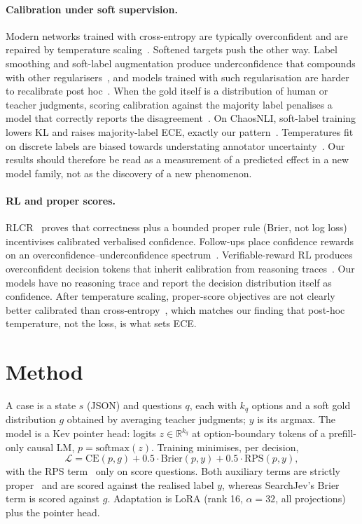 \documentclass{article}
\begin{document}
\paragraph{Calibration under soft supervision.} Modern networks trained with
cross-entropy are typically overconfident and are repaired by temperature
scaling~\cite{guo2017calibration,desai2020calibration}. Softened targets
push the other way. Label smoothing and soft-label augmentation produce
underconfidence that compounds with other
regularisers~\cite{muller2019labelsmoothing,wen2021ensembles}, and models
trained with such regularisation are harder to recalibrate
post hoc~\cite{wang2021rethinking}. When the gold itself is a distribution
of human or teacher judgments, scoring calibration against the majority
label penalises a model that correctly reports the
disagreement~\cite{baan2022stop,nie2020chaosnli}. On ChaosNLI, soft-label
training lowers KL and raises majority-label ECE, exactly our
pattern~\cite{kohli2026saturation}. Temperatures fit on discrete labels are
biased towards understating annotator
uncertainty~\cite{tao2026ambiguous,dogah2026tsnotenough}. Our results
should therefore be read as a measurement of a predicted effect in a new
model family, not as the discovery of a new phenomenon.

\paragraph{RL and proper scores.} RLCR~\cite{damani2025rlcr} proves that
correctness plus a bounded proper rule (Brier, not log loss) incentivises
calibrated verbalised confidence. Follow-ups place confidence rewards on an
overconfidence--underconfidence spectrum~\cite{tan2026rewardfunctions}.
Verifiable-reward RL produces overconfident decision tokens that inherit
calibration from reasoning traces~\cite{yaldiz2026calibration}. Our models
have no reasoning trace and report the decision distribution itself as
confidence. After temperature scaling, proper-score objectives are not
clearly better calibrated than cross-entropy~\cite{deka2026sbert2s1}, which
matches our finding that post-hoc temperature, not the loss, is what
sets ECE.

\section{Method}
\label{sec:method}

A case is a state $s$ (JSON) and questions $q$, each with $k_q$ options and
a soft gold distribution $g$ obtained by averaging teacher judgments; $y$ is
its argmax. The model is a Kev pointer head: logits $z \in \mathbb{R}^{k_q}$
at option-boundary tokens of a prefill-only causal LM, $p =
\mathrm{softmax}(z)$. Training minimises, per decision,
\[
\mathcal{L} = \mathrm{CE}(p, g) + 0.5\cdot\mathrm{Brier}(p, y)
+ 0.5\cdot\mathrm{RPS}(p, y),
\]
with the RPS term~\cite{epstein1969rps} only on score questions. Both
auxiliary terms are strictly proper~\cite{gneiting2007proper} and are
scored against the realised label $y$, whereas SearchJev's Brier term is
scored against $g$. Adaptation is LoRA (rank 16, $\alpha=32$, all
projections) plus the pointer head.
\end{document}

